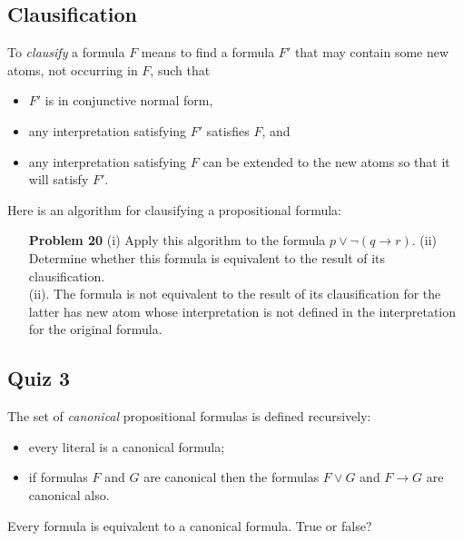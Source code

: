 \subsection{Clausification}
To \textit{clausify} a formula $F$ means to find a formula 
$F'$ that may contain some new atoms, not occurring in $F$, such that
\begin{itemize}
\item $F'$ is in conjunctive normal form,
\item any interpretation satisfying $F'$ satisfies $F$, and 
\item any interpretation satisfying $F$ can be extended to the new atoms so that it will satisfy $F'$. 
\end{itemize}
Here is an algorithm for clausifying a propositional formula: \\
\begin{algorithm}[H]
\end{algorithm}

\begin{enumerate}
\item[\textbf{Problem 20}] (i) Apply this algorithm to the formula $p \vee \neg (q \rightarrow r)$. (ii) Determine whether this formula is equivalent to the result of its clausification. \\
(ii). The formula is not equivalent to the result of its clausification for the latter has new atom whose interpretation is not defined in the interpretation for the original formula. 
\end{enumerate}


\subsection{Quiz 3}
\noindent
The set of \textit{canonical} propositional formulas is defined recursively:
\begin{itemize}
\item every literal is a canonical formula;
\item if formulas $F$ and $G$ are canonical then the formulas $F \vee G$ and $F \rightarrow G$ are canonical also. 
\end{itemize}
Every formula is equivalent to a canonical formula. True or false?\\

